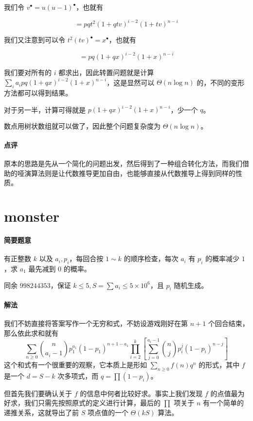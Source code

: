 \documentclass[12pt]{ctexart}
\theoremstyle{theorem}
\theoremstyle{theorem}
\begin{document}
我们令 $v^{\bullet}=u(u-1)^{\bullet}$，也就有

$$
= pq t^2 (1+qtv)^{i-2} (1+tv)^{n-i}
$$

我们又注意到可以令 $t^2(tv)^\bullet = x^\bullet$，也就有

$$
= pq (1+qx)^{i-2}(1+x)^{n-i}
$$

我们要对所有的 $i$ 都求出，因此转置问题就是计算 $\sum_i a_i pq (1+qx)^{i-2}(1+x)^{n-i}$，这是显然可以 $\Theta(n\log n)$ 的，不同的变形方法都可以得到结果。

对于另一半，计算可得就是 $p (1+qx)^{i-2}(1+x)^{n-i}$，少一个 $q$。

数点用树状数组就可以做了，因此整个问题复杂度为 $\Theta(n\log n)$。

\paragraph{点评} 原本的思路是先从一个简化的问题出发，然后得到了一种组合转化方法，而我们借助的哑演算法则是让代数推导更加自由，也能够直接从代数推导上得到同样的性质。

\newpage

\section{monster}

\paragraph{简要题意} 有正整数 $k$ 以及 $a_i, p_i$，每回合按 $1\sim k$ 的顺序检查，每次 $a_i$ 有 $p_i$ 的概率减少 $1$，求 $a_1$ 最先减到 $0$ 的概率。

同余 $998244353$，保证 $k\le 5, S=\sum a_i \le 5\times 10^6$，且 $p_i$ 随机生成。

\paragraph{解法}

我们不妨直接将答案写作一个无穷和式，不妨设游戏刚好在第 $n+1$ 个回合结束，那么依此求和就有
$$
\sum_{n\ge 0} \binom n{a_i-1} p_1^{a_1} (1-p_1)^{n+1-a_1} \prod_{i=2}^k
\left[\sum_{j=0}^{a_i-1} \binom n j p_i^j(1-p_i)^{n-j}\right]
$$
这个和式有一个很重要的观察，它本质上是形如 $\sum_{n\ge 0} f(n) q^n$ 的形式，其中 $f$ 是一个 $d=S - k$ 次多项式，而 $q = \prod (1-p_i)$。

但首先我们要确认关于 $f$ 的信息中何者比较好求。事实上我们发现 $f$ 的点值最为好求，我们只需先按照原式的定义进行计算，最后的 $\prod$ 项关于 $n$ 有一个简单的递推关系，这就导出了前 $S$ 项点值的一个 $\Theta(kS)$ 算法。
\end{document}

